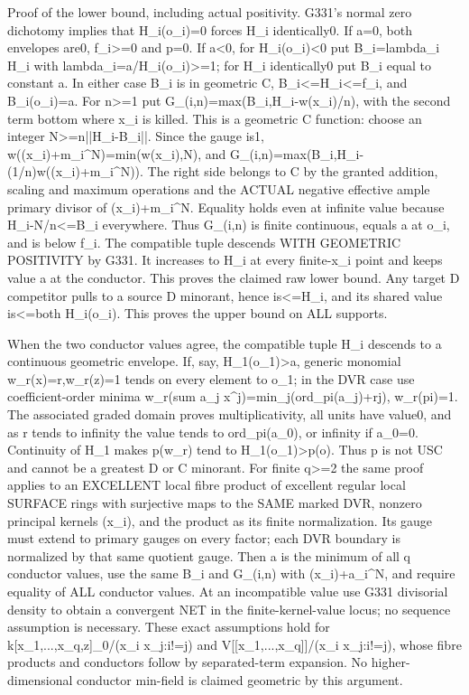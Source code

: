 \documentclass[11pt]{article}
\begin{document}
Proof of the lower bound, including actual positivity. G331's normal zero dichotomy implies that H\_i(o\_i)=0 forces H\_i identically0. If a=0, both envelopes are0, f\_i\textgreater{}=0 and p=0. If a\textless{}0, for H\_i(o\_i)\textless{}0 put B\_i=lambda\_i H\_i with lambda\_i=a/H\_i(o\_i)\textgreater{}=1; for H\_i identically0 put B\_i equal to constant a. In either case B\_i is in geometric C, B\_i\textless{}=H\_i\textless{}=f\_i, and B\_i(o\_i)=a. For n\textgreater{}=1 put
G\_(i,n)=max(B\_i,H\_i-w(x\_i)/n),
with the second term bottom where x\_i is killed. This is a geometric C function: choose an integer N\textgreater{}=n||H\_i-B\_i||. Since the gauge is1, w((x\_i)+m\_i\textasciicircum{}N)=min(w(x\_i),N), and
G\_(i,n)=max(B\_i,H\_i-(1/n)w((x\_i)+m\_i\textasciicircum{}N)).
The right side belongs to C by the granted addition, scaling and maximum operations and the ACTUAL negative effective ample primary divisor of (x\_i)+m\_i\textasciicircum{}N. Equality holds even at infinite value because H\_i-N/n\textless{}=B\_i everywhere. Thus G\_(i,n) is finite continuous, equals a at o\_i, and is below f\_i. The compatible tuple descends WITH GEOMETRIC POSITIVITY by G331. It increases to H\_i at every finite-x\_i point and keeps value a at the conductor. This proves the claimed raw lower bound. Any target D competitor pulls to a source D minorant, hence is\textless{}=H\_i, and its shared value is\textless{}=both H\_i(o\_i). This proves the upper bound on ALL supports.

When the two conductor values agree, the compatible tuple H\_i descends to a continuous geometric envelope. If, say, H\_1(o\_1)\textgreater{}a, generic monomial w\_r(x)=r,w\_r(z)=1 tends on every element to o\_1; in the DVR case use coefficient-order minima w\_r(sum a\_j x\textasciicircum{}j)=min\_j(ord\_pi(a\_j)+rj), w\_r(pi)=1. The associated graded domain proves multiplicativity, all units have value0, and as r tends to infinity the value tends to ord\_pi(a\_0), or infinity if a\_0=0. Continuity of H\_1 makes p(w\_r) tend to H\_1(o\_1)\textgreater{}p(o). Thus p is not USC and cannot be a greatest D or C minorant. For finite q\textgreater{}=2 the same proof applies to an EXCELLENT local fibre product of excellent regular local SURFACE rings with surjective maps to the SAME marked DVR, nonzero principal kernels (x\_i), and the product as its finite normalization. Its gauge must extend to primary gauges on every factor; each DVR boundary is normalized by that same quotient gauge. Then a is the minimum of all q conductor values, use the same B\_i and G\_(i,n) with (x\_i)+a\_i\textasciicircum{}N, and require equality of ALL conductor values. At an incompatible value use G331 divisorial density to obtain a convergent NET in the finite-kernel-value locus; no sequence assumption is necessary. These exact assumptions hold for k[x\_1,...,x\_q,z]\_0/(x\_i x\_j:i!=j) and V[[x\_1,...,x\_q]]/(x\_i x\_j:i!=j), whose fibre products and conductors follow by separated-term expansion. No higher-dimensional conductor min-field is claimed geometric by this argument.
\end{document}
